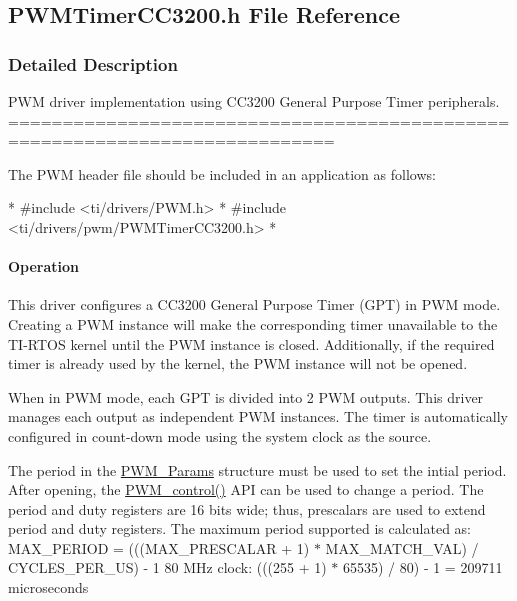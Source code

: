 \subsection{P\-W\-M\-Timer\-C\-C3200.\-h File Reference}
\label{_p_w_m_timer_c_c3200_8h}


\subsubsection{Detailed Description}
P\-W\-M driver implementation using C\-C3200 General Purpose Timer peripherals. ============================================================================

The P\-W\-M header file should be included in an application as follows\-: 
\begin{DoxyCode}
*  #include <ti/drivers/PWM.h>
*  #include <ti/drivers/pwm/PWMTimerCC3200.h>
*  
\end{DoxyCode}


\paragraph*{Operation}

This driver configures a C\-C3200 General Purpose Timer (G\-P\-T) in P\-W\-M mode. Creating a P\-W\-M instance will make the corresponding timer unavailable to the T\-I-\/\-R\-T\-O\-S kernel until the P\-W\-M instance is closed. Additionally, if the required timer is already used by the kernel, the P\-W\-M instance will not be opened.

When in P\-W\-M mode, each G\-P\-T is divided into 2 P\-W\-M outputs. This driver manages each output as independent P\-W\-M instances. The timer is automatically configured in count-\/down mode using the system clock as the source.

The period in the \hyperlink{struct_p_w_m___params}{P\-W\-M\-\_\-\-Params} structure must be used to set the intial period. After opening, the \hyperlink{_p_w_m_8h_ade999f5b12997479efa1ac85aaf46ef5}{P\-W\-M\-\_\-control()} A\-P\-I can be used to change a period. The period and duty registers are 16 bits wide; thus, prescalars are used to extend period and duty registers. The maximum period supported is calculated as\-: M\-A\-X\-\_\-\-P\-E\-R\-I\-O\-D = (((M\-A\-X\-\_\-\-P\-R\-E\-S\-C\-A\-L\-A\-R + 1) $\ast$ M\-A\-X\-\_\-\-M\-A\-T\-C\-H\-\_\-\-V\-A\-L) / C\-Y\-C\-L\-E\-S\-\_\-\-P\-E\-R\-\_\-\-U\-S) -\/ 1 80 M\-Hz clock\-: (((255 + 1) $\ast$ 65535) / 80) -\/ 1 = 209711 microseconds

